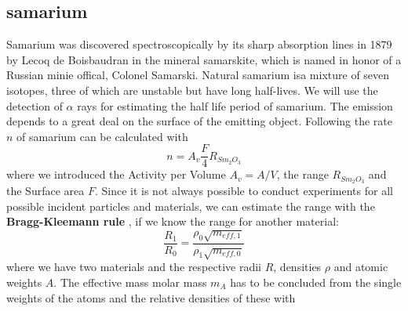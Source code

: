 \subsection{samarium}
\label{subsec:samarium_theory}
Samarium was discovered spectroscopically by its sharp absorption lines in 1879
by Lecoq de Boisbaudran \cite{haynes}
in the mineral samarskite, which is named in honor of a Russian minie offical, Colonel Samarski.
Natural samarium isa mixture of seven isotopes, three of which are unstable but have long half-lives.
We will use the detection of $\alpha$ rays for estimating the half life period of samarium. 
The emission depends to a great deal on the surface of the emitting object.
Following \cite{ver} the rate $n$ of samarium can be calculated with
\begin{equation}
n = A_v \frac{F}{4} R_{Sm_2O_3}
\label{eq:range2}
\end{equation}
where we introduced the Activity per Volume $A_v = A/V$, the range $R_{Sm_2O_3}$ and the Surface area $F$.
Since it is not always possible to conduct experiments for all possible incident particles and materials, we
can estimate the range with the \textbf{Bragg-Kleemann rule} \cite{knoll2000radiation}, if we know
the range for another material:
\begin{equation}
    \frac{R_1}{R_0} = \frac{\rho_0 \sqrt{m_{eff,1}}}{\rho_1 \sqrt{m_{eff,0}}} 
    \label{eq:range}
\end{equation}
where we have two materials and the respective radii $R$, densities $\rho$ and atomic weights $A$. 
The effective mass molar mass $m_A$ has to be concluded from the single weights of the atoms and the relative densities of these with

